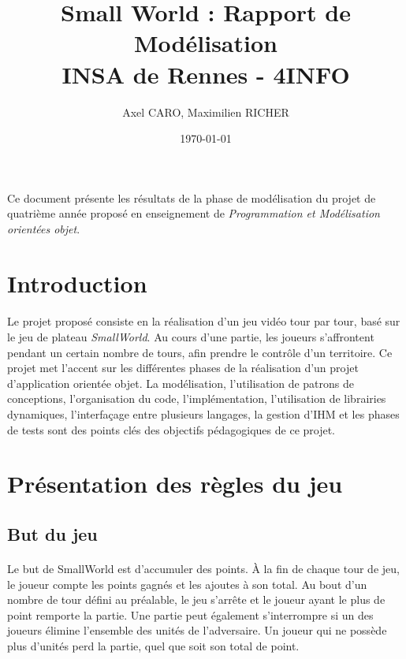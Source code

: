 \documentclass[a4paper]{article}
\title{Small World : Rapport de Modélisation \\ INSA de Rennes - 4INFO}
\author{Axel CARO, Maximilien RICHER}
\date{\today}
\begin{document}
\maketitle

\paragraph{}
Ce document présente les résultats de la phase de modélisation du projet de quatrième année proposé en enseignement de \textit{Programmation et Modélisation orientées objet}.

\newpage

\section*{Introduction}
\paragraph{}
Le projet proposé consiste en la réalisation d'un jeu vidéo tour par tour, basé sur le jeu de plateau \textit{SmallWorld}. Au cours d'une partie, les joueurs s'affrontent pendant un certain nombre de tours, afin prendre le contrôle d'un territoire. Ce projet met l'accent sur les différentes phases de la réalisation d'un projet d'application orientée objet. La modélisation, l'utilisation de patrons de conceptions, l'organisation du code, l'implémentation, l'utilisation de librairies dynamiques, l'interfaçage entre plusieurs langages, la gestion d'IHM et les phases de tests sont des points clés des objectifs pédagogiques de ce projet.

\section{Présentation des règles du jeu}

\subsection{But du jeu}
\paragraph{}
Le but de SmallWorld est d'accumuler des points.
À la fin de chaque tour de jeu, le joueur compte les points gagnés et les ajoutes à son total. Au bout d'un nombre de tour défini au préalable, le jeu s'arrête et le joueur ayant le plus de point remporte la partie. Une partie peut également s'interrompre si un des joueurs élimine l'ensemble des unités de l'adversaire. Un joueur qui ne possède plus d'unités perd la partie, quel que soit son total de point.
\end{document}
